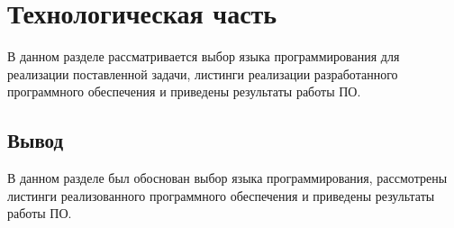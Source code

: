 \chapter{Технологическая часть}

В данном разделе рассматривается выбор языка программирования для реализации поставленной задачи, листинги реализации разработанного программного обеспечения и приведены результаты работы ПО.

\section*{Вывод}

В данном разделе был обоснован выбор языка программирования, рассмотрены листинги реализованного программного обеспечения и приведены результаты работы ПО.